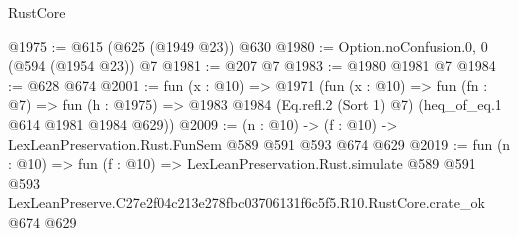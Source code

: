 \begin{lexlean}{RustCore}
\begin{coremodule}
@1975 := @615 (@625 (@1949 @23)) @630
@1980 := Option.noConfusion.{0, 0} (@594 (@1954 @23)) @7
@1981 := @207 @7
@1983 := @1980 @1981 @7
@1984 := @628 @674
@2001 := fun (x : @10) =>
  @1971
    (fun (x : @10) =>
    fun (fn : @7) =>
    fun (h : @1975) => @1983 @1984 (Eq.refl.{2} (Sort 1) @7) (heq_of_eq.{1} @614 @1981 @1984 @629))
@2009 := (n : @10) -> (f : @10) -> LexLeanPreservation.Rust.FunSem @589 @591 @593 @674 @629
@2019 := fun (n : @10) =>
  fun (f : @10) =>
  LexLeanPreservation.Rust.simulate
    @589
    @591
    @593
    LexLeanPreserve.C27e2f04c213e278fbc03706131f6c5f5.R10.RustCore.crate_ok
    @674
    @629
\end{coremodule}
\end{lexlean}
